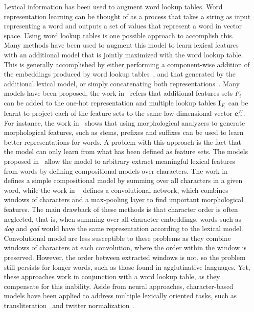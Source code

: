 \documentclass[11pt]{article}
\newcommand{\examp}[1]{\emph{#1}}
\begin{document}
\begin{CJK*}{UTF8}{gbsn}
Lexical information has been used to augment word lookup tables. Word representation learning can be thought of as a process that takes a string as input representing a word and outputs a set of values that represent a word in vector space. Using word lookup tables is one possible approach to accomplish this. Many methods have been used to augment this model to learn lexical features with an additional model that is jointly maximized with the word lookup table. This is generally accomplished by either performing a component-wise addition of the embeddings produced by word lookup tables~\cite{chenjoint}, and that generated by the additional lexical model, or simply concatenating both representations~\cite{icml2014c2_santos14}. Many models have been proposed, the work in~\cite{collobert2011natural} refers that additional features sets $F_i$ can be added to the one-hot representation and multiple lookup tables $\mathbf{I}_{F_i}$ can be learnt to project each of the feature sets to the same low-dimensional vector $\mathbf{e}^W_w$. For instance, the work in~\cite{Botha2014} shows that using morphological analyzers to generate morphological features, such as stems, prefixes and suffixes can be used to learn better representations for words. A problem with this approach is the fact that the model can only learn from what has been defined as feature sets. The models proposed in~\cite{icml2014c2_santos14,chenjoint} allow the model to arbitrary extract meaningful lexical features from words by defining compositional models over characters. The work in~\cite{chenjoint} defines a simple compositional model by summing over all characters in a given word, while the work in ~\cite{icml2014c2_santos14} defines a convolutional network, which combines windows of characters and a max-pooling layer to find important morphological features. The main drawback of these methods is that character order is often neglected, that is, when summing over all character embeddings, words such as \examp{dog} and \examp{god} would have the same representation according to the lexical model. Convolutional model are less susceptible to these problems as they combine windows of characters at each convolution, where the order within the window is preserved. However, the order between extracted windows is not, so the problem still persists for longer words, such as those found in agglutinative languages. Yet, these approaches work in conjunction with a word lookup table, as they compensate for this inability. Aside from neural approaches, character-based models have been applied to address multiple lexically oriented tasks, such as transliteration~\cite{kang2000automatic} and twitter normalization~\cite{xu-ritter-grishman:2013:BUCC,ling-EtAl:2013:EMNLP}.


\end{CJK*}
\end{document}
